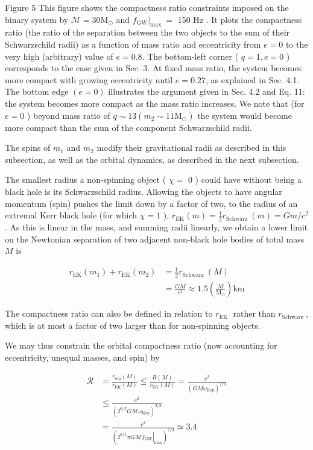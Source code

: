 \documentclass[10pt]{article}
\begin{document}
Figure 5 This figure shows the compactness ratio constraints imposed on the binary system by $\mathscr{M}=30 \mathrm{M}_{\odot}$ and $\left.f_{\mathrm{GW}}\right|_{\text {max }}=$ 150 Hz . It plots the compactness ratio (the ratio of the separation between the two objects to the sum of their Schwarzschild radii) as a function of mass ratio and eccentricity from $e=0$ to the very high (arbitrary) value of $e=0.8$. The bottom-left corner ( $q=1, e=0$ ) corresponds to the case given in Sec. 3. At fixed mass ratio, the system becomes more compact with growing eccentricity until $e=0.27$, as explained in Sec. 4.1. The bottom edge $(e=0)$ illustrates the argument given in Sec. 4.2 and Eq. 11: the system becomes more compact as the mass ratio increases. We note that (for $e=0$ ) beyond mass ratio of $q \sim 13\left(m_{2} \sim 11 \mathrm{M}_{\odot}\right)$ the system would become more compact than the sum of the component Schwarzschild radii.

The spins of $m_{1}$ and $m_{2}$ modify their gravitational radii as described in this subsection, as well as the orbital dynamics, as described in the next subsection.

The smallest radius a non-spinning object ( $\chi=$ 0 ) could have without being a black hole is its Schwarzschild radius. Allowing the objects to have angular momentum (spin) pushes the limit down by a factor of two, to the radius of an extremal Kerr black hole (for which $\chi=1$ ), $r_{\mathrm{EK}}(m)=\frac{1}{2} r_{\text {Schwarz }}(m)=G m / c^{2}$. As this is linear in the mass, and summing radii linearly, we obtain a lower limit on the Newtonian separation of two adjacent non-black hole bodies of total mass $M$ is


\begin{align*}
r_{\mathrm{EK}}\left(m_{1}\right)+r_{\mathrm{EK}}\left(m_{2}\right) & =\frac{1}{2} r_{\text {Schwarz }}(M) \\
& =\frac{G M}{c^{2}} \approx 1.5\left(\frac{M}{\mathrm{M}_{\odot}}\right) \mathrm{km} \tag{13}
\end{align*}


The compactness ratio can also be defined in relation to $r_{\text {EK }}$ rather than $r_{\text {Schwarz }}$, which is at most a factor of two larger than for non-spinning objects.

We may thus constrain the orbital compactness ratio (now accounting for eccentricity, unequal masses, and spin) by


\begin{align*}
\mathscr{R} & =\frac{r_{\mathrm{sep}}(M)}{r_{\mathrm{EK}}(M)} \leq \frac{R(M)}{r_{\mathrm{EK}}(M)}=\frac{c^{2}}{\left(G M \omega_{\mathrm{Kep}}\right)^{2 / 3}} \\
& \leq \frac{c^{2}}{\left(2^{6 / 5} G \mathscr{M} \omega_{\mathrm{Kep}}\right)^{2 / 3}} \\
& =\frac{c^{2}}{\left(\left.2^{6 / 5} \pi G \mathscr{M} f_{\mathrm{GW}}\right|_{\max }\right)^{2 / 3}} \simeq 3.4 \tag{14}
\end{align*}
\end{document}
